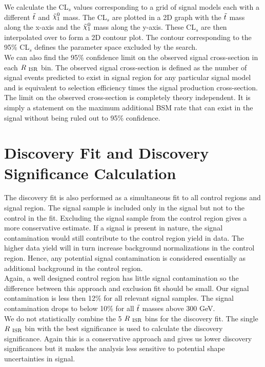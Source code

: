 \indent We calculate the CL$_s$ values corresponding to a grid of signal models each with a different $\tilde{t}$ and $\ninoone$ mass.  The CL$_s$ are plotted in a 2D graph with the $\tilde{t}$ mass along the x-axis and the $\ninoone$ mass along the y-axis.  These CL$_s$ are then interpolated over to form a 2D contour plot.  The contour corresponding to the 95\% CL$_s$ defines the parameter space excluded by the search. \\

\indent We can also find the 95\% confidence limit on the observed signal cross-section in each $R_{~\mathrm{ISR}}$ bin.  The observed signal cross-section is defined as the number of signal events predicted to exist in signal region for any particular signal model and is equivalent to selection efficiency times the signal production cross-section.  The limit on the observed cross-section is completely theory independent.  It is simply a statement on the maximum additional BSM rate that can exist in the signal without being ruled out to 95\% confidence.  \\

\section{Discovery Fit and Discovery Significance Calculation}
\label{sec:stat:discovery}

\indent The discovery fit is also performed as a simultaneous fit to all control regions and signal region.  The signal sample is included only in the signal but not to the control in the fit.  Excluding the signal sample from the control region gives a more conservative estimate.  If a signal is present in nature, the signal contamination would still contribute to the control region yield in data.  The higher data yield will in turn increase background normalizations in the control region.  Hence, any potential signal contamination is considered essentially as additional background in the control region. \\

\indent  Again, a well designed control region has little signal contamination so the difference between this approach and exclusion fit should be small.  Our signal contamination is less then 12\% for all relevant signal samples.  The signal contamination drops to below 10\% for all $\tilde{t}$ masses above 300 GeV.  \\  

\indent We do not statistically combine the 5 $R_{~\mathrm{ISR}}$ bins for the discovery fit.  The single $R_{~\mathrm{ISR}}$ bin with the best significance is used to calculate the discovery significance.  Again this is a conservative approach and gives us lower discovery significances but it makes the analysis less sensitive to potential shape uncertainties in signal.  \\

